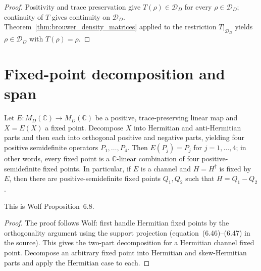 \begin{proof}\leanok
    Positivity and trace preservation give $T(\rho)\in\mathcal D_D$ for every
    $\rho\in\mathcal D_D$; continuity of $T$ gives continuity on $\mathcal D_D$.
    Theorem~\ref{thm:brouwer_density_matrices} applied to the restriction
    $T|_{\mathcal D_D}$ yields $\rho\in\mathcal D_D$ with $T(\rho)=\rho$.
\end{proof}

\section{Fixed-point decomposition and span}

\begin{theorem}\label{thm:positive_fixedpoint_decomp}
    \leanok
    Let $E\colon M_D(\mathbb C)\to M_D(\mathbb C)$ be a positive,
    trace-preserving linear map and $X=E(X)$ a fixed point.
    Decompose $X$ into Hermitian and anti-Hermitian parts and then each into
    orthogonal positive and negative parts, yielding four positive
    semidefinite operators $P_1,\dots,P_4$.
    Then $E(P_j)=P_j$ for $j=1,\dots,4$;
    in other words, every fixed point is a $\mathbb C$-linear combination
    of four positive-semidefinite fixed points. In particular, if $E$ is a
    channel and $H=H^\dagger$ is fixed by $E$, then there are
    positive-semidefinite fixed points $Q_1,Q_2$ such that $H=Q_1-Q_2$.

    This is Wolf Proposition~6.8.
\end{theorem}

\begin{proof}\leanok
    The proof follows Wolf: first handle Hermitian fixed points by the
    orthogonality argument using the support projection (equation~(6.46)--(6.47)
    in the source). This gives the two-part decomposition for a Hermitian
    channel fixed point. Decompose an arbitrary fixed point into Hermitian and
    skew-Hermitian parts and apply the Hermitian case to each.
\end{proof}

